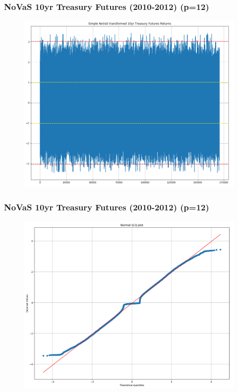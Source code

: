 \documentclass{beamer}
\begin{document}
\begin{frame}
\frametitle{NoVaS 10yr Treasury Futures (2010-2012) (p=12)}
\begin{figure}[h!]
\includegraphics[width=\textwidth]{novas_ty_returns_2010.png}
\end{figure}
\end{frame}

\begin{frame}
\frametitle{NoVaS 10yr Treasury Futures (2010-2012) (p=12)}
\begin{figure}[h!]
\includegraphics[width=\textwidth]{novas_ty_returns_2010_qqplot.png}
\end{figure}
\end{frame}
\end{document}
